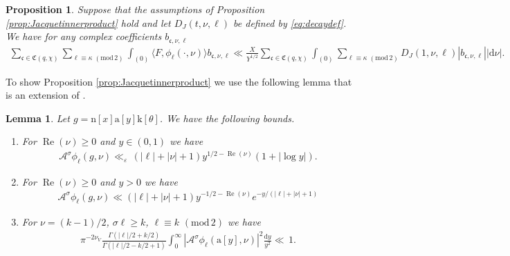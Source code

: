 \documentclass[12pt]{amsart}
\newtheorem{lemma}[theorem]{Lemma}
\newtheorem{proposition}[theorem]{Proposition}
\theoremstyle{definition}
\theoremstyle{remark}
\numberwithin{equation}{section}
\newcommand{\1}{{\mathbf 1}}
\newcommand{\eps}{\varepsilon}
\renewcommand{\Re}{\operatorname{Re}}
\renewcommand{\c}{\mathfrak c}
\renewcommand{\d}{\mathrm d}
\renewcommand{\pmod}[1]{\,\,(\mathrm{mod}\,{#1})}
\begin{document}
\begin{proposition} \label{prop:eisenstein0prop}
Suppose that the assumptions of Proposition \ref{prop:Jacquetinnerproduct} hold and let $D_J(t,\nu,\ell)$ be defined by \eqref{eq:decaydef}.  We have for any  complex coefficients $b_{\mathfrak{c},\nu,\ell}$
    \begin{align*}
     \sum_{\c \in \mathfrak{C}(q,\chi)} \sum_{\ell \equiv \kappa \pmod{2} } \int_{(0)}\langle F,\phi_\ell (\cdot,\nu)\rangle b_{\mathfrak{c},\nu,\ell}\ll\frac{X}{Y^{1/2}} \sum_{\c \in \mathfrak{C}(q,\chi)}\int_{(0)} \sum_{\ell \equiv \kappa \pmod{2} }D_J(1,\nu,\ell) |b_{\mathfrak{c},\nu,\ell}|  |\d \nu|.
    \end{align*}
\end{proposition}
To show Proposition \ref{prop:Jacquetinnerproduct} we use the following lemma that is an extension of \cite[eqs. (15.4), (15.5)]{motohashielements}.
\begin{lemma} \label{le:whittakerbounds}
Let $g= \mathrm{n}[x] \mathrm{a}[y] \mathrm{k}[\theta]$. 
We have the following bounds. 
 \begin{enumerate}
     \item For $\Re(\nu) \geq 0$ and $y \in (0,1)$ we have
    \begin{align*}
        \mathcal{A}^{\sigma} \phi_{\ell}(g,\nu) \ll_\eps \, (|\ell| + |\nu| + 1)y^{1/2-\Re(\nu)} (1+|\log y|).
    \end{align*}

    \item For $\Re(\nu)  \geq 0$ and $y > 0$ we have
    \begin{align*}
    \mathcal{A}^{\sigma} \phi_{\ell}(g,\nu) \ll  (|\ell|+|\nu|+1) y^{-1/2-\Re(\nu)} e^{-y/(|\ell| + |\nu| + 1)}
    \end{align*}
    \item  For $\nu=(k-1)/2$, $\sigma \ell \geq k$, $\ell \equiv k \pmod{2}$  we have
    \begin{align*}
          \pi^{-2 \nu_V}\frac{\Gamma(|\ell|/2+k/2)}{\Gamma(|\ell|/2-k/2+1)}  \int_0^\infty |\mathcal{A}^\sigma  \phi_{\ell}(\mathrm{a}[y],\nu) |^2 \frac{\d y}{y^2} \ll \, 1.
    \end{align*}
 \end{enumerate}  
 
\end{lemma}
\end{document}

